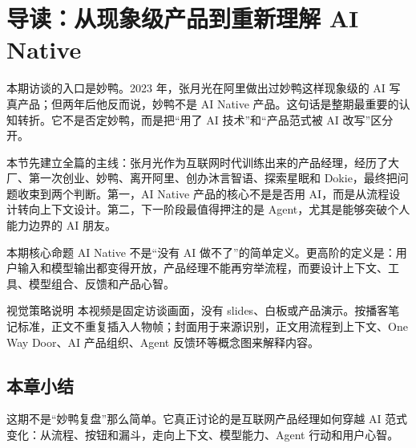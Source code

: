 \section{导读：从现象级产品到重新理解 AI Native}

本期访谈的入口是妙鸭。2023 年，张月光在阿里做出过妙鸭这样现象级的 AI 写真产品；但两年后他反而说，妙鸭不是 AI Native 产品。这句话是整期最重要的认知转折。它不是否定妙鸭，而是把“用了 AI 技术”和“产品范式被 AI 改写”区分开。

本节先建立全篇的主线：张月光作为互联网时代训练出来的产品经理，经历了大厂、第一次创业、妙鸭、离开阿里、创办沐言智语、探索星眠和 Dokie，最终把问题收束到两个判断。第一，AI Native 产品的核心不是是否用 AI，而是从流程设计转向上下文设计。第二，下一阶段最值得押注的是 Agent，尤其是能够突破个人能力边界的 AI 朋友。

\begin{importantbox}{本期核心命题}
AI Native 不是“没有 AI 做不了”的简单定义。更高阶的定义是：用户输入和模型输出都变得开放，产品经理不能再穷举流程，而要设计上下文、工具、模型组合、反馈和产品心智。
\end{importantbox}

\begin{knowledgebox}{视觉策略说明}
本视频是固定访谈画面，没有 slides、白板或产品演示。按播客笔记标准，正文不重复插入人物帧；封面用于来源识别，正文用流程到上下文、One Way Door、AI 产品组织、Agent 反馈环等概念图来解释内容。
\end{knowledgebox}

\subsection{本章小结}

这期不是“妙鸭复盘”那么简单。它真正讨论的是互联网产品经理如何穿越 AI 范式变化：从流程、按钮和漏斗，走向上下文、模型能力、Agent 行动和用户心智。

